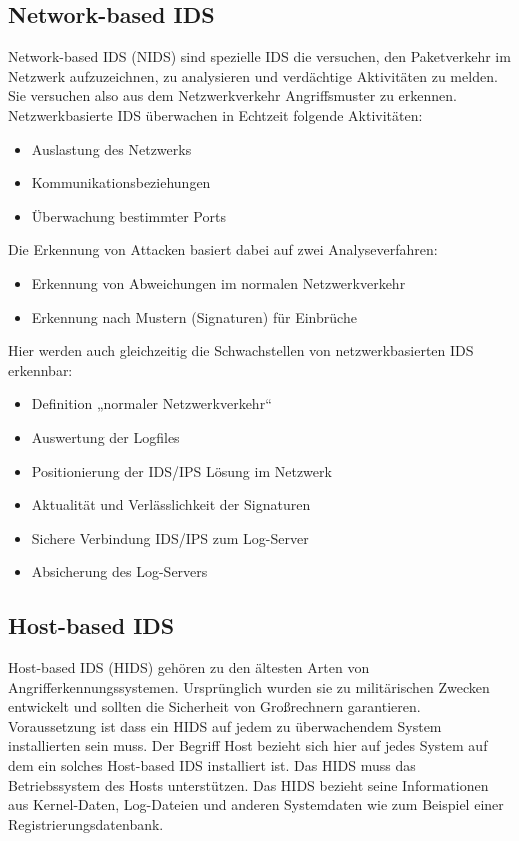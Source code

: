 \documentclass[11pt]{scrartcl}
\begin{document}
\subsection{Network-based IDS}
\label{sec:nw-based IDS}
Network-based IDS (NIDS) sind spezielle IDS die versuchen, den Paketverkehr im Netzwerk aufzuzeichnen, zu analysieren und verdächtige Aktivitäten zu melden. Sie versuchen also aus dem Netzwerkverkehr Angriffsmuster zu erkennen.\\
Netzwerkbasierte IDS überwachen in Echtzeit folgende Aktivitäten:
\begin{itemize}

\item Auslastung des Netzwerks
\item Kommunikationsbeziehungen
\item Überwachung bestimmter Ports\\
\end{itemize}
Die Erkennung von Attacken basiert dabei auf zwei Analyseverfahren:
\begin{itemize}
\item Erkennung von Abweichungen im normalen Netzwerkverkehr
\item Erkennung nach Mustern (Signaturen) für Einbrüche\\
\end{itemize}
Hier werden auch gleichzeitig die Schwachstellen von netzwerkbasierten IDS erkennbar:
\begin{itemize}
\item Definition „normaler Netzwerkverkehr“
\item Auswertung der Logfiles
\item Positionierung der IDS/IPS Lösung im Netzwerk
\item Aktualität und Verlässlichkeit der Signaturen
\item Sichere Verbindung IDS/IPS zum Log-Server
\item Absicherung des Log-Servers
\end{itemize}
\cite{8}

\subsection{Host-based IDS}
\label{sec:host based IDS}
Host-based IDS (HIDS) gehören zu den ältesten Arten von Angrifferkennungssystemen. Ursprünglich wurden sie zu militärischen Zwecken entwickelt und sollten die Sicherheit von Großrechnern garantieren. Voraussetzung ist dass ein HIDS auf jedem zu überwachendem System installierten sein muss. Der Begriff \grqq{}Host\grqq{} bezieht sich hier auf jedes System auf dem ein solches Host-based IDS installiert ist. Das HIDS muss das Betriebssystem des Hosts unterstützen.
Das HIDS bezieht seine Informationen aus Kernel-Daten, Log-Dateien und anderen Systemdaten wie zum Beispiel einer Registrierungsdatenbank.\\\\\\
\end{document}
